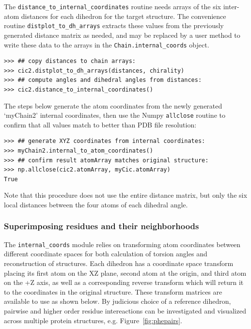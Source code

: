 The \texttt{distance\_to\_internal\_coordinates\(\)} routine needs arrays of the six
inter-atom distances for each dihedron for the target structure.  The convenience
routine \texttt{distplot\_to\_dh\_arrays\(\)} extracts these values from the previously
generated distance matrix as needed, and may be replaced by a user method to
write these data to the arrays in the \texttt{Chain.internal\_coords} object.

\begin{verbatim}
>>> ## copy distances to chain arrays:
>>> cic2.distplot_to_dh_arrays(distances, chirality)
>>> ## compute angles and dihedral angles from distances:
>>> cic2.distance_to_internal_coordinates()
\end{verbatim}

The steps below generate the atom coordinates from the newly generated `myChain2' internal
coordinates, then use the Numpy \texttt{allclose\(\)} routine to confirm that all values match to
better than PDB file resolution:

\begin{verbatim}
>>> ## generate XYZ coordinates from internal coordinates:
>>> myChain2.internal_to_atom_coordinates()
>>> ## confirm result atomArray matches original structure:
>>> np.allclose(cic2.atomArray, myCic.atomArray)
True
\end{verbatim}

Note that this procedure does not use the entire distance matrix, but only the six local distances
between the four atoms of each dihedral angle.

\subsubsection{Superimposing residues and their neighborhoods}

The \texttt{internal\_coords} module relies on transforming atom coordinates between
different coordinate spaces for both calculation of torsion angles and reconstruction of
structures.  Each dihedron has a coordinate space transform placing its first atom on the
XZ plane, second atom at the origin, and third atom on the +Z axis, as well as a corresponding
reverse transform which will return it to the coordinates in the original structure.  These
transform matrices are available to use as shown below.  By judicious choice of a reference
dihedron, pairwise and higher order residue intereactions can be investigated and visualized
across multiple protein structures, e.g. Figure~\ref{fig:phepairs}.

